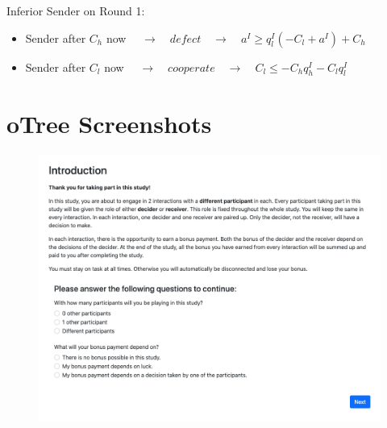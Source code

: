 \documentclass[11pt]{article}
\theoremstyle{plainCl1}
\begin{document}
Inferior Sender on Round 1:
\begin{itemize} [noitemsep]
	\item Sender after $C_h$ now $\quad \rightarrow \quad defect \quad \rightarrow \quad a^I \geq q^I_l (-C_l + a^I) + C_h$\\
	\item Sender after $C_l$ now $\quad \rightarrow \quad cooperate \quad \rightarrow \quad C_l \leq -C_h q^I_h - C_l q^I_l$\\
\end{itemize}






\section{oTree Screenshots}

\begin{figure}[h]
\centering
\includegraphics[scale=0.5]{welcome}
\end{figure}
\end{document}
